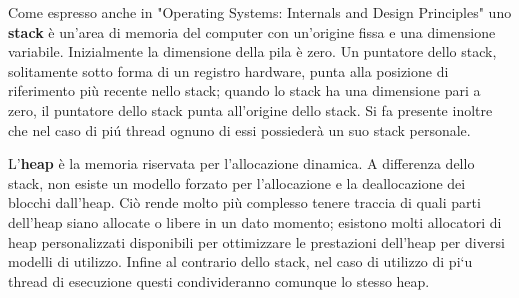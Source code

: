 {Come espresso anche in "Operating Systems: Internals and Design Principles"\cite{SO:14} uno \textbf{stack} \`e un'area di memoria del computer con un'origine fissa e una dimensione variabile. Inizialmente la dimensione della pila \`e zero. Un puntatore dello stack, solitamente sotto forma di un registro hardware, punta alla posizione di riferimento pi\`u recente nello stack; quando lo stack ha una dimensione pari a zero, il puntatore dello stack punta all'origine dello stack. Si fa presente inoltre che nel caso di pi\'u thread ognuno di essi possieder\`a un suo stack personale.

L'\textbf{heap }\`e la memoria riservata per l'allocazione dinamica. A differenza dello stack, non esiste un modello forzato per l'allocazione e la deallocazione dei blocchi dall'heap. Ci\`o rende molto pi\`u complesso tenere traccia di quali parti dell'heap siano allocate o libere in un dato momento; esistono molti allocatori di heap personalizzati disponibili per ottimizzare le prestazioni dell'heap per diversi modelli di utilizzo.
Infine al contrario dello stack, nel caso di utilizzo di pi`u thread di esecuzione questi condivideranno comunque lo stesso heap.
}

